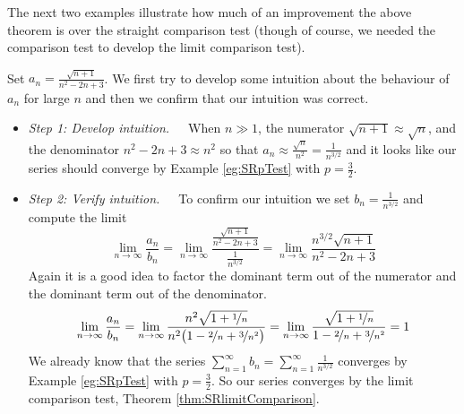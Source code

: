 The next two examples illustrate how much of an improvement the above
theorem is over the straight comparison test (though of course, we
needed the comparison test to develop the limit comparison test).
\begin{eg}[$\sum_{n=1}^\infty\frac{\sqrt{n+1}}{n^2-2n+3}$]\label{eg:SRlimCompA}
Set $a_n= \frac{\sqrt{n+1}}{n^2-2n+3}$.  We first try to develop some
intuition about the behaviour of $a_n$ for large $n$ and then we confirm
that our intuition was correct.
\begin{itemize}
\item \emph{Step 1: Develop intuition.}\ \ \
When $n\gg 1$,
the numerator $\sqrt{n+1}\approx \sqrt{n}$, and the denominator
$n^2-2n+3\approx n^2$ so that
$a_n\approx \frac{\sqrt{n}}{n^2}=\frac{1}{n^{3/2}}$ and it looks like
our series should converge by Example \ref{eg:SRpTest} with $p=\frac{3}{2}$.

\item \emph{Step 2: Verify intuition.}\ \ \
To confirm our intuition we set $b_n=\frac{1}{n^{3/2}}$ and
compute the limit
\begin{equation*}
\lim_{n\rightarrow\infty}\frac{a_n}{b_n}
=\lim_{n\rightarrow\infty}\frac{\frac{\sqrt{n+1}}{n^2-2n+3}}{\frac{1}{n^{3/2}}}
=\lim_{n\rightarrow\infty}\frac{n^{3/2}\sqrt{n+1}}{n^2-2n+3}
\end{equation*}
Again it is a good idea to factor the dominant term out of the
numerator and the dominant term out of the denominator.
\begin{equation*}
\lim_{n\rightarrow\infty}\frac{a_n}{b_n}
=\lim_{n\rightarrow\infty}\frac{n^2\sqrt{1+\nicefrac{1}{n}}}
                {n^2\big(1-\nicefrac{2}{n}+\nicefrac{3}{n^2}\big)}
=\lim_{n\rightarrow\infty}\frac{\sqrt{1+\nicefrac{1}{n}}}
           {1-\nicefrac{2}{n}+\nicefrac{3}{n^2}}
=1
\end{equation*}
We already know that the series $\sum_{n=1}^\infty b_n
=\sum_{n=1}^\infty\frac{1}{n^{3/2}}$ converges by
Example \ref{eg:SRpTest} with $p=\frac{3}{2}$.
So our series converges by the limit comparison test,
Theorem \ref{thm:SRlimitComparison}.
\end{itemize}
\end{eg}

